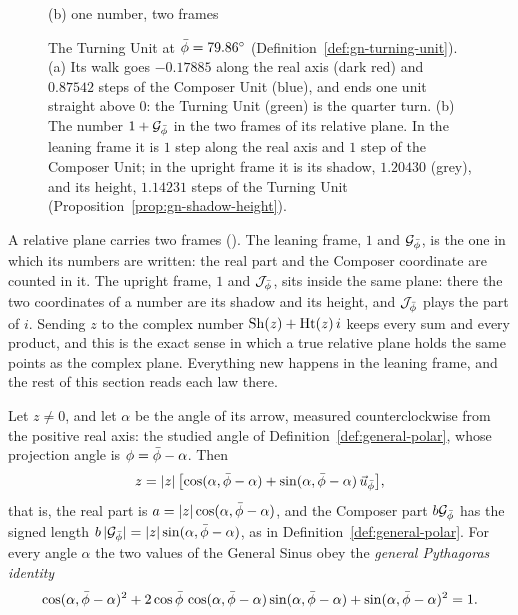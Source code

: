 \begin{figure}[tb]
\begin{minipage}[b]{0.52\textwidth}
\smallskip
{\small (b) one number, two frames\par}
\end{minipage}
\caption[The Turning Unit and the two frames]{The Turning Unit at $\bar{\phi} = 79.86^\circ$ (Definition~\ref{def:gn-turning-unit}). (a) Its walk goes $-0.17885$ along the real axis (dark red) and $0.87542$ steps of the Composer Unit (blue), and ends one unit straight above $0$: the Turning Unit (green) is the quarter turn. (b) The number $1 + \mathcal{G}_{\bar{\phi}}$ in the two frames of its relative plane. In the leaning frame it is $1$ step along the real axis and $1$ step of the Composer Unit; in the upright frame it is its shadow, $1.20430$ (grey), and its height, $1.14231$ steps of the Turning Unit (Proposition~\ref{prop:gn-shadow-height}).}
\label{fig:gn-turning-unit}
\end{figure}

\begin{plainwords}
A relative plane carries two frames (). The leaning frame, $1$ and $\mathcal{G}_{\bar{\phi}}$, is the one in which its numbers are written: the real part and the Composer coordinate are counted in it. The upright frame, $1$ and $\mathcal{J}_{\bar{\phi}}$, sits inside the same plane: there the two coordinates of a number are its shadow and its height, and $\mathcal{J}_{\bar{\phi}}$ plays the part of $i$. Sending $z$ to the complex number $\operatorname{Sh}(z) + \operatorname{Ht}(z)\,i$ keeps every sum and every product, and this is the exact sense in which a true relative plane holds the same points as the complex plane. Everything new happens in the leaning frame, and the rest of this section reads each law there.
\end{plainwords}

\begin{theorem}\label{thm:gn-polar}
Let $z \neq 0$, and let $\alpha$ be the angle of its arrow, measured counterclockwise from the positive real axis: the studied angle of Definition~\ref{def:general-polar}, whose projection angle is $\phi = \bar{\phi} - \alpha$. Then
\[
z = |z|\,\bigl[\cos(\alpha, \bar{\phi} - \alpha) + \sin(\alpha, \bar{\phi} - \alpha)\,\vec{u}_{\bar{\phi}}\bigr] ,
\]
that is, the real part is $a = |z|\cos(\alpha, \bar{\phi} - \alpha)$, and the Composer part $b\mathcal{G}_{\bar{\phi}}$ has the signed length $b\,|\mathcal{G}_{\bar{\phi}}| = |z|\sin(\alpha, \bar{\phi} - \alpha)$, as in Definition~\ref{def:general-polar}. For every angle $\alpha$ the two values of the General Sinus obey the \emph{general Pythagoras identity}
\[
\cos(\alpha, \bar{\phi} - \alpha)^2 + 2\cos\bar{\phi}\,\cos(\alpha, \bar{\phi} - \alpha)\sin(\alpha, \bar{\phi} - \alpha) + \sin(\alpha, \bar{\phi} - \alpha)^2 = 1 .
\]
\end{theorem}

